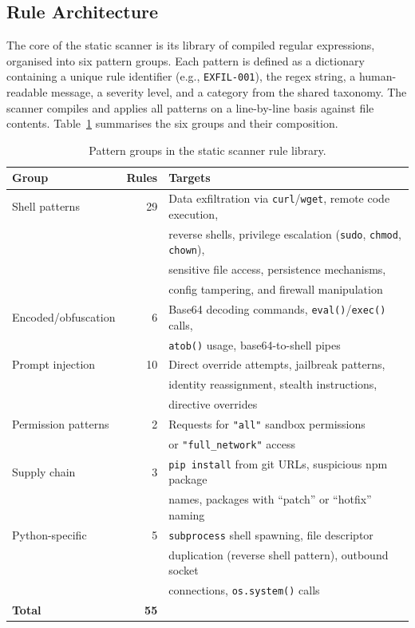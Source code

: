 \subsection{Rule Architecture}

The core of the static scanner is its library of compiled regular expressions, organised into six pattern groups. Each pattern is defined as a dictionary containing a unique rule identifier (e.g., \texttt{EXFIL-001}), the regex string, a human-readable message, a severity level, and a category from the shared taxonomy. The scanner compiles and applies all patterns on a line-by-line basis against file contents. Table~\ref{tab:pattern-groups} summarises the six groups and their composition.

\begin{table}[ht]
\centering
\caption{Pattern groups in the static scanner rule library.}
\label{tab:pattern-groups}
\begin{tabular}{l r l}
\hline
\textbf{Group} & \textbf{Rules} & \textbf{Targets} \\
\hline
Shell patterns & 29 & Data exfiltration via \texttt{curl}/\texttt{wget}, remote code execution, \\
               &    & reverse shells, privilege escalation (\texttt{sudo}, \texttt{chmod}, \texttt{chown}), \\
               &    & sensitive file access, persistence mechanisms, \\
               &    & config tampering, and firewall manipulation \\
Encoded/obfuscation & 6 & Base64 decoding commands, \texttt{eval()}/\texttt{exec()} calls, \\
                     &   & \texttt{atob()} usage, base64-to-shell pipes \\
Prompt injection & 10 & Direct override attempts, jailbreak patterns, \\
                 &    & identity reassignment, stealth instructions, \\
                 &    & directive overrides \\
Permission patterns & 2 & Requests for \texttt{"all"} sandbox permissions \\
                    &   & or \texttt{"full\_network"} access \\
Supply chain & 3 & \texttt{pip install} from git URLs, suspicious npm package \\
             &   & names, packages with ``patch'' or ``hotfix'' naming \\
Python-specific & 5 & \texttt{subprocess} shell spawning, file descriptor \\
                &   & duplication (reverse shell pattern), outbound socket \\
                &   & connections, \texttt{os.system()} calls \\
\hline
\textbf{Total} & \textbf{55} & \\
\hline
\end{tabular}
\end{table}

